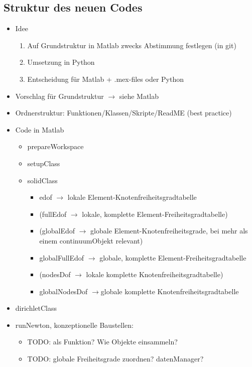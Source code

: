 \documentclass{scrarticle}
\begin{document}
\subsection*{Struktur des neuen Codes}
\begin{itemize}
\item Idee
  \begin{enumerate}
    \item Auf Grundstruktur in Matlab zwecks Abstimmung festlegen (in git)
    \item Umsetzung in Python
    \item Entscheidung f\"ur Matlab + .mex-files oder Python
    \end{enumerate}
  \item Vorschlag f\"ur Grundstruktur \(\rightarrow\) siehe Matlab
    \item Ordnerstruktur: Funktionen/Klassen/Skripte/ReadME (best practice)
    \item Code in Matlab
      \begin{itemize}
      \item prepareWorkspace
      \item setupClass
      \item solidClass
        \begin{itemize}
        \item edof \(\rightarrow\) lokale Element-Knotenfreiheitsgradtabelle
        \item (fullEdof \(\rightarrow\) lokale, komplette Element-Freiheitsgradtabelle)
        \item (globalEdof \(\rightarrow\) globale Element-Knotenfreiheitsgrade, bei mehr als einem continuumObjekt relevant)
        \item globalFullEdof \(\rightarrow\) globale, komplette Element-Freiheitsgradtabelle
        \item (nodesDof \(\rightarrow\) lokale komplette Knotenfreiheitsgradtabelle)
        \item globalNodesDof \(\rightarrow\)globale komplette Knotenfreiheitsgradtabelle
        \end{itemize}
        \end{itemize}
      \item dirichletClass
      \item runNewton, konzeptionelle Baustellen:
        \begin{itemize}
        \item TODO: als Funktion? Wie Objekte einsammeln?
        \item TODO: globale Freiheitsgrade zuordnen? datenManager? 
        \end{itemize}
      \end{itemize}
\end{document}
